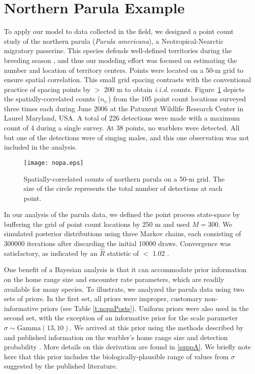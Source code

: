 \section{Northern Parula Example}



To apply our model to data collected in the field, we designed a point
count study of the northern parula ({\it Parula americana}), a
Neotropical-Nearctic migratory passerine. This species defends
well-defined territories during the breeding season
\citep{moldenhaer_regelski_1996}, and thus our modeling effort was focused
on estimating the number and location of territory centers. Points
were located on a 50-m grid to ensure spatial
correlation. This small grid spacing contrasts with the conventional
practice of spacing points by $>$ 200 m to obtain \emph{i.i.d.}
counts. Figure~\ref{fig:nopaDat} depicts the spatially-correlated
counts ($n_{r.}$) from the 105 point count locations
surveyed three times each during June 2006
at the Patuxent Wildlife Research Center in Laurel Maryland, USA.
A total of 226 detections were made with a maximum count of 4 during a
single survey. At 38 points, no warblers were detected. All but one of
the detections were of singing males, and this one observation was
not included in the analysis.



\begin{figure}
  \centering
  \texttt{[image: nopa.eps]}
  \caption{Spatially-correlated counts of northern parula on a 50-m
    grid. The size of the circle represents the total number of
    detections at each point.}
  \label{fig:nopaDat}
\end{figure}



In our analysis of the parula data, we defined the point process
state-space by buffering the grid of point
count locations by 250 m and used $M=300$. We simulated posterior
distributions using three Markov chains,
each consisting of 300000 iterations after discarding the initial 10000
draws. Convergence was satisfactory, as indicated by an $\hat{R}$
statistic of $<$ 1.02 \citep{gelman_rubin:1992}.

One benefit of a Bayesian analysis is that it can accommodate prior
information on the home range size and encounter rate parameters,
which are readily available for many
species. To illustrate, we analyzed the parula data using two sets of
priors. In the first set, all priors were
improper, customary non-informative priors (see Table \ref{t:nopaPosts}).
Uniform priors were also used in the second set, with the exception of
an informative prior for the scale parameter $\sigma \sim
\mbox{Gamma}(13,10)$. We arrived at this prior using the methods
described by \citet{royle_etal:2011mee} and published
information on the warbler's home range size and detection probability
\citep{moldenhaer_regelski_1996,simons_etal:2009}. More details on this
derivation are found in \ref{suppA}. We briefly note here that this prior
includes the biologically-plausible range of values from $\sigma$
suggested by the published literature.

